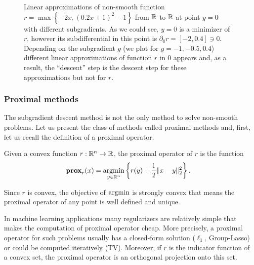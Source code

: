 \begin{figure}[H]
    \centering
    
    \caption{Linear approximations of non-smooth function $r = \max\left\{-2x, (0.2x+1)^2 - 1\right\}$ from $\mathbb{R}$ to $\mathbb{R}$
    at point $y = 0$ with different subgradients. As we could see, $y=0$ is a minimizer of $r$, however its subdifferential in this point is $\partial_0 r = [-2, 0.4]\ni0$. Depending on the subgradient $g$ (we plot for $g=-1, -0.5, 0.4$) different linear approximations of function $r$ in $0$ appears and, as a result, the ``descent'' step is the descent step for these approximations but not for $r$.}
    \label{fig:nonsmooth_approx}
\end{figure}


\subsubsection{Proximal methods}
The subgradient descent method is not the only method to solve non-smooth problems. Let us present the class of methods called proximal methods and, first, let us recall the definition of a proximal operator.

\begin{definition}\label{def:proximal_operator}
Given a convex function $r:\mathbb{R}^n\rightarrow \mathbb{R}$, the proximal operator of $r$ is the function
\begin{equation}
\mathbf{prox}_r(x) = \operatorname*{argmin}_{y\in\mathbb{R}^n}\left\{r(y) + \frac{1}{2}\|x-y\|_2^2\right\}.
\end{equation}
\end{definition}
Since $r$ is convex, the objective of $\operatorname*{argmin}$ is strongly convex that means the proximal operator of any point is well defined and unique.

In machine learning applications many regularizers are relatively simple that makes the computation of proximal operator cheap. More precisely, a proximal operator for such problems usually has a closed-form solution ($\ell_1$, Group-Lasso) or could be computed iteratively (TV). Moreover, if $r$ is the indicator function of a convex set, the proximal operator is an orthogonal projection onto this set. 

